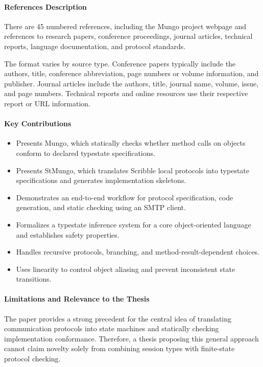 \paragraph{References Description}
There are 45 numbered references, including the Mungo project webpage and references to research papers, conference proceedings, journal articles, technical reports, language documentation, and protocol standards.

The format varies by source type. Conference papers typically include the authors, title, conference abbreviation, page numbers or volume information, and publisher. Journal articles include the authors, title, journal name, volume, issue, and page numbers. Technical reports and online resources use their respective report or URL information.

\paragraph{Key Contributions}
\begin{itemize}
    \item Presents Mungo, which statically checks whether method calls on objects conform to declared typestate specifications.
    \item Presents StMungo, which translates Scribble local protocols into typestate specifications and generates implementation skeletons.
    \item Demonstrates an end-to-end workflow for protocol specification, code generation, and static checking using an SMTP client.
    \item Formalizes a typestate inference system for a core object-oriented language and establishes safety properties.
    \item Handles recursive protocols, branching, and method-result-dependent choices.
    \item Uses linearity to control object aliasing and prevent inconsistent state transitions.
\end{itemize}

\paragraph{Limitations and Relevance to the Thesis}
The paper provides a strong precedent for the central idea of translating communication protocols into state machines and statically checking implementation conformance. Therefore, a thesis proposing this general approach cannot claim novelty solely from combining session types with finite-state protocol checking.

